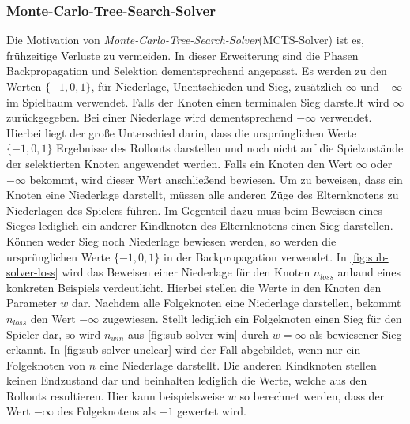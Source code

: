\documentclass[12pt,a4paper,bibliography=totocnumbered,listof=totocnumbered]{article}
\begin{document}
\subsubsection{Monte-Carlo-Tree-Search-Solver} \label{sec:mcts_solver}
Die Motivation von \emph{Monte-Carlo-Tree-Search-Solver}(MCTS-Solver) ist es, frühzeitige Verluste zu vermeiden. In dieser Erweiterung sind die Phasen Backpropagation und Selektion dementsprechend angepasst. Es werden zu den Werten $\{-1, 0, 1\}$, für Niederlage, Unentschieden und Sieg, zusätzlich $\infty$ und $-\infty$ im Spielbaum verwendet. Falls der Knoten einen terminalen Sieg darstellt wird $\infty$ zurückgegeben. Bei einer Niederlage wird dementsprechend $-\infty$ verwendet. Hierbei liegt der große Unterschied darin, dass die ursprünglichen Werte $\{-1, 0, 1\}$ Ergebnisse des Rollouts darstellen und noch nicht auf die Spielzustände der selektierten Knoten angewendet werden. Falls ein Knoten den Wert $\infty$ oder $-\infty$ bekommt, wird dieser Wert anschließend bewiesen. Um zu beweisen, dass ein Knoten eine Niederlage darstellt, müssen alle anderen Züge des Elternknotens zu Niederlagen des Spielers führen. Im Gegenteil dazu muss beim Beweisen eines Sieges lediglich ein anderer Kindknoten des Elternknotens einen Sieg darstellen. Können weder Sieg noch Niederlage bewiesen werden, so werden die ursprünglichen Werte $\{-1, 0, 1\}$ in der Backpropagation verwendet. In \autoref{fig:sub-solver-loss} wird das Beweisen einer Niederlage für den Knoten $n_{loss}$ anhand eines konkreten Beispiels verdeutlicht. Hierbei stellen die Werte in den Knoten den Parameter $w$ dar. Nachdem alle Folgeknoten eine Niederlage darstellen, bekommt $n_{loss}$ den Wert $-\infty$ zugewiesen. Stellt lediglich ein Folgeknoten einen Sieg für den Spieler dar, so wird $n_{win}$ aus \autoref{fig:sub-solver-win} durch $w=\infty$ als bewiesener Sieg erkannt. In \autoref{fig:sub-solver-unclear} wird der Fall abgebildet, wenn nur ein Folgeknoten von $n$ eine Niederlage darstellt. Die anderen Kindknoten stellen keinen Endzustand dar und beinhalten lediglich die Werte, welche aus den Rollouts resultieren. Hier kann beispielsweise $w$ so berechnet werden, dass der Wert $-\infty$ des Folgeknotens als $-1$ gewertet wird.\\
\end{document}
